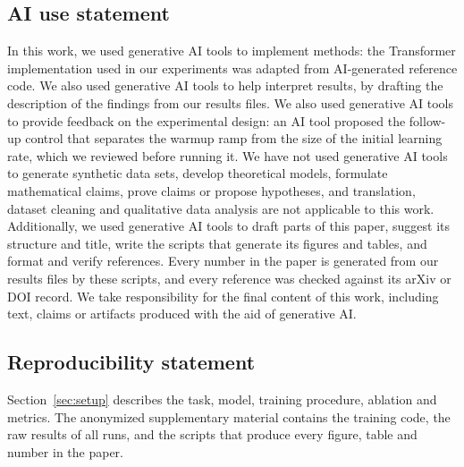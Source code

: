 \subsection*{AI use statement}

In this work, we used generative AI tools to implement methods: the Transformer implementation used in our
experiments was adapted from AI-generated reference code.
We also used generative AI tools to help interpret results, by drafting the description of the findings from our
results files. We also used generative AI tools to provide feedback on the experimental design: an AI tool proposed the
follow-up control that separates the warmup ramp from the size of the initial learning rate, which we reviewed
before running it. We have not used generative AI tools to generate synthetic data sets, develop theoretical models,
formulate mathematical claims, prove claims or propose hypotheses, and translation, dataset
cleaning and qualitative data analysis are not applicable to this work. Additionally, we used generative AI tools to
draft parts of this paper, suggest its structure and title, write the scripts that generate its figures and tables,
and format and verify references. Every number in the paper is generated from our results files by these scripts,
and every reference was checked against its arXiv or DOI record.
We take responsibility for the final content of this work, including text, claims or artifacts produced with the aid
of generative AI.

\subsection*{Reproducibility statement}

Section~\ref{sec:setup} describes the task, model, training procedure, ablation and metrics. The anonymized
supplementary material contains the training code, the raw results of all runs, and the scripts that produce every
figure, table and number in the paper.
